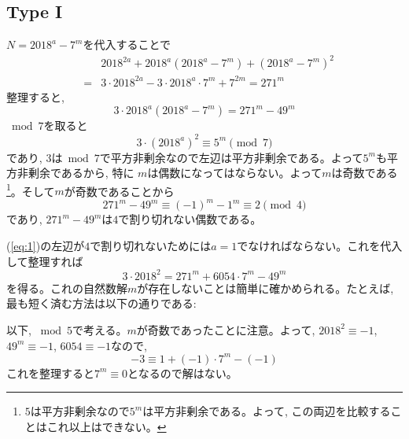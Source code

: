 \subsection*{Type I}
$N=2018^{a} - 7^{m}$を代入することで
\begin{eqnarray*} 
& &2018^{2a} + 2018^{a}(2018^{a} - 7^m) + (2018^{a} - 7^{m})^2 \\
&=& 3\cdot 2018^{2a} -3\cdot 2018^{a}\cdot 7^{m} + 7^{2m} = 271^m
\end{eqnarray*}
整理すると, 
\begin{equation} \label{eq:1}
3\cdot 2018^{a}(2018^{a} - 7^m) = 271^{m} - 49^{m}
\end{equation}
$\bmod{7}$を取ると
\[3\cdot (2018^{a})^{2} \equiv 5^{m}\pmod{7}\]
であり, $3$は$\bmod{7}$で平方非剰余なので左辺は平方非剰余である。よって$5^{m}$も平方非剰余であるから, 特に $m$は偶数になってはならない。よって$m$は奇数である\footnote{$5$は平方非剰余なので$5^{m}$は平方非剰余である。よって, この両辺を比較することはこれ以上はできない。}。そして$m$が奇数であることから
\[271^{m} - 49^{m} \equiv (-1)^{m} - 1^{m} \equiv 2\pmod{4}\]
であり, $271^{m} - 49^{m}$は$4$で割り切れない偶数である。\par 
(\cref{eq:1})の左辺が$4$で割り切れないためには$a=1$でなければならない。これを代入して整理すれば
\[3\cdot 2018^2 = 271^{m} + 6054\cdot 7^{m} - 49^{m} \]
を得る。これの自然数解$m$が存在しないことは簡単に確かめられる。たとえば, 最も短く済む方法は以下の通りである: \par 
以下, $\bmod{5}$で考える。$m$が奇数であったことに注意。よって, $2018^{2} \equiv -1$, $49^{m} \equiv -1$, $6054\equiv -1$なので, 
\[-3 \equiv 1 + (-1)\cdot 7^{m} - (-1)\]
これを整理すると$7^{m} \equiv 0$となるので解はない。
